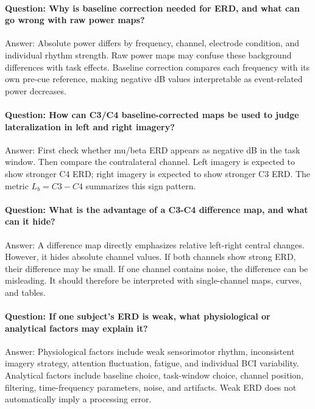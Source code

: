 \documentclass[a4paper,11pt]{article}
\numberwithin{equation}{section}
\begin{document}
\paragraph{Question: Why is baseline correction needed for ERD, and what can go wrong with raw power maps?}
Answer: Absolute power differs by frequency, channel, electrode condition, and individual rhythm strength. Raw power maps may confuse these background differences with task effects. Baseline correction compares each frequency with its own pre-cue reference, making negative dB values interpretable as event-related power decreases.

\paragraph{Question: How can C3/C4 baseline-corrected maps be used to judge lateralization in left and right imagery?}
Answer: First check whether mu/beta ERD appears as negative dB in the task window. Then compare the contralateral channel. Left imagery is expected to show stronger C4 ERD; right imagery is expected to show stronger C3 ERD. The metric $L_b=C3-C4$ summarizes this sign pattern.

\paragraph{Question: What is the advantage of a C3-C4 difference map, and what can it hide?}
Answer: A difference map directly emphasizes relative left-right central changes. However, it hides absolute channel values. If both channels show strong ERD, their difference may be small. If one channel contains noise, the difference can be misleading. It should therefore be interpreted with single-channel maps, curves, and tables.

\paragraph{Question: If one subject's ERD is weak, what physiological or analytical factors may explain it?}
Answer: Physiological factors include weak sensorimotor rhythm, inconsistent imagery strategy, attention fluctuation, fatigue, and individual BCI variability. Analytical factors include baseline choice, task-window choice, channel position, filtering, time-frequency parameters, noise, and artifacts. Weak ERD does not automatically imply a processing error.

\FloatBarrier
\clearpage
\end{document}
